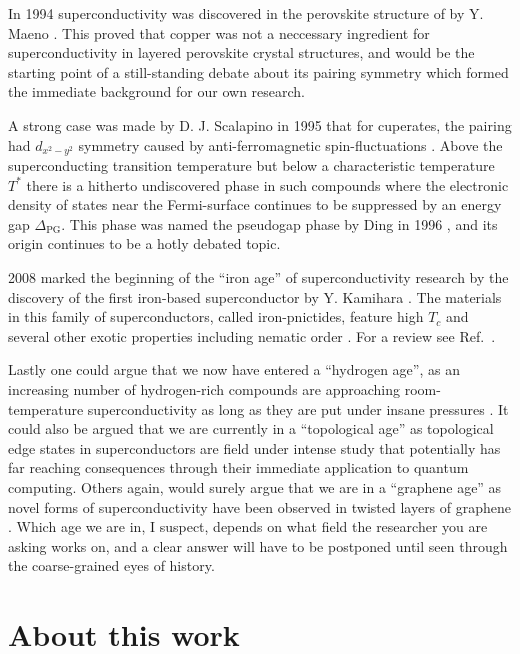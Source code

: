 In 1994 superconductivity was discovered in the perovskite structure of  by Y. Maeno \etal \cite{Maeno94}. This proved that copper
was not a neccessary ingredient for superconductivity in layered perovskite crystal structures, and would be the starting point of a still-standing
debate about its pairing symmetry which formed the immediate background for our own research.

A strong case was made by D. J. Scalapino in
1995 that for cuperates, the pairing had $d_{x^2-y^2}$ symmetry caused by anti-ferromagnetic spin-fluctuations \cite{Scalapino95}. Above the superconducting transition
temperature but below a characteristic temperature $T^\ast$ there is a hitherto undiscovered phase in such compounds where the electronic density of
states near the Fermi-surface continues to be suppressed by an energy gap $\Delta_\text{PG}$. This phase was named the pseudogap phase by Ding \etal
in 1996 \cite{Ding96}, and its origin continues to be a hotly debated topic.

2008 marked the beginning of the ``iron age'' of superconductivity research by the discovery of the first iron-based superconductor  by
Y. Kamihara \etal \cite{Kamihara08}. The materials in this family of superconductors, called iron-pnictides, feature high $T_c$ and several other exotic
properties including nematic order \cite{Fernandes14}. For a review see Ref.~\cite{Paglione10}.

Lastly one could argue that we now have entered a ``hydrogen age'', as an increasing number of hydrogen-rich compounds are approaching room-temperature
superconductivity as long as they are put under insane pressures \cite{Semenok20, Snider20}. It could also be argued that we are currently in a
``topological age'' as topological edge states in superconductors are field under intense study \cite{Wang20} that potentially has far reaching
consequences through their immediate application to quantum computing. Others again, would surely argue that we are in a ``graphene age'' as 
novel forms of superconductivity have been observed in twisted layers of graphene \cite{Park21}.
Which age we are in, I suspect, depends on what field the researcher
you are asking works on, and a clear answer will have to be postponed until seen through the coarse-grained eyes of history.


\section{About this work}

